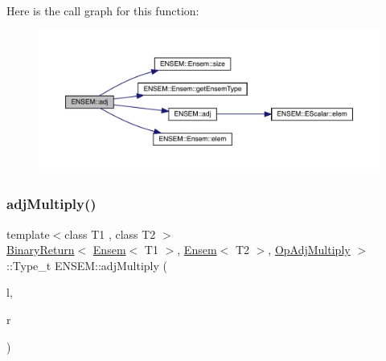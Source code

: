 Here is the call graph for this function\+:\nopagebreak
\begin{figure}[H]
\begin{center}
\leavevmode
\includegraphics[width=350pt]{d1/d9e/group__eensem_ga3c4b288659953aefecfc3a19bb11f326_cgraph}
\end{center}
\end{figure}
\mbox{\label{group__eensem_ga5f37d8984a1db92adfb04f6c0908a563}} 
\subsubsection{\texorpdfstring{adjMultiply()}{adjMultiply()}\hspace{0.1cm}{\footnotesize\ttfamily [1/3]}}
{\footnotesize\ttfamily template$<$class T1 , class T2 $>$ \\
\mbox{\hyperlink{structENSEM_1_1BinaryReturn}{Binary\+Return}}$<$ \mbox{\hyperlink{classENSEM_1_1Ensem}{Ensem}}$<$ T1 $>$, \mbox{\hyperlink{classENSEM_1_1Ensem}{Ensem}}$<$ T2 $>$, \mbox{\hyperlink{structENSEM_1_1OpAdjMultiply}{Op\+Adj\+Multiply}} $>$\+::Type\+\_\+t E\+N\+S\+E\+M\+::adj\+Multiply (\begin{DoxyParamCaption}\item[{const \mbox{\hyperlink{classENSEM_1_1Ensem}{Ensem}}$<$ T1 $>$ \&}]{l,  }\item[{const \mbox{\hyperlink{classENSEM_1_1Ensem}{Ensem}}$<$ T2 $>$ \&}]{r }\end{DoxyParamCaption})\hspace{0.3cm}{\ttfamily [inline]}}

